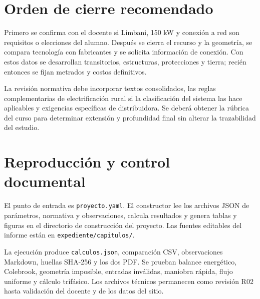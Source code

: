 \section{Orden de cierre recomendado}
Primero se confirma con el docente si Limbani, 150 kW y conexión a red son requisitos o elecciones del alumno. Después se cierra el recurso y la geometría, se compara tecnología con fabricantes y se solicita información de conexión. Con estos datos se desarrollan transitorios, estructuras, protecciones y tierra; recién entonces se fijan metrados y costos definitivos.

La revisión normativa debe incorporar textos consolidados, las reglas complementarias de electrificación rural si la clasificación del sistema las hace aplicables y exigencias específicas de distribuidora. Se deberá obtener la rúbrica del curso para determinar extensión y profundidad final sin alterar la trazabilidad del estudio.

\section{Reproducción y control documental}
El punto de entrada es \texttt{proyecto.yaml}. El constructor lee los archivos JSON de parámetros, normativa y observaciones, calcula resultados y genera tablas y figuras en el directorio de construcción del proyecto. Las fuentes editables del informe están en \texttt{expediente/capitulos/}.

La ejecución produce \texttt{calculos.json}, comparación CSV, observaciones Markdown, huellas SHA-256 y los dos PDF. Se prueban balance energético, Colebrook, geometría imposible, entradas inválidas, maniobra rápida, flujo uniforme y cálculo trifásico. Los archivos técnicos permanecen como revisión R02 hasta validación del docente y de los datos del sitio.
